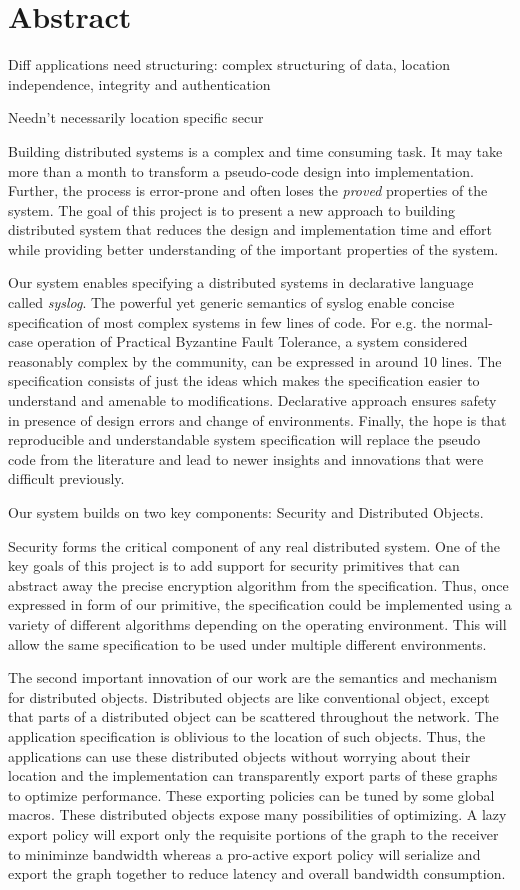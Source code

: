 \section{Abstract}

Diff applications need structuring: complex structuring of data, location independence, integrity and authentication

Needn't necessarily location specific
secur

Building distributed systems is a complex and time consuming task. It may take more than a month to transform a pseudo-code design into implementation. Further, the process is error-prone and often loses the {\em proved} properties of the system. The goal of this project is to present a new approach to building distributed system that reduces the design and implementation time and effort while providing better understanding of the important properties of the system. 

Our system enables specifying a distributed systems in declarative language called {\em syslog}. The powerful yet generic semantics of syslog enable concise specification of most complex systems in few lines of code. For e.g. the normal-case operation of Practical Byzantine Fault Tolerance, a system considered reasonably complex by the community, can be expressed in around 10 lines. The specification consists of just the ideas which makes the specification easier to understand and amenable to modifications. Declarative approach ensures safety in presence of design errors and change of environments. Finally, the hope is that reproducible and understandable system specification will replace the pseudo code from the literature and lead to newer insights and innovations that were difficult previously. 

Our system builds on two key components: Security and Distributed Objects.

Security forms the critical component of any real distributed system. One of the key goals of this project is to add support for security primitives that can abstract away the precise encryption algorithm from the specification. Thus, once expressed in form of our primitive, the specification could be implemented using a variety of different algorithms depending on the operating environment. This will allow the same specification to be used under multiple different environments.

The second important innovation of our work are the semantics and mechanism for distributed objects. Distributed objects are like conventional object, except that parts of a distributed object can be scattered throughout the network. The application specification is oblivious to the location of such objects. Thus, the applications can use these distributed objects without worrying about their location and the implementation can transparently export parts of these graphs to optimize performance. These exporting policies can be tuned by some global macros. These distributed objects expose many possibilities of optimizing. A lazy export policy will export only the requisite portions of the graph to the receiver to miniminze bandwidth whereas a pro-active export policy will serialize and export the graph together to reduce latency and overall bandwidth consumption.

